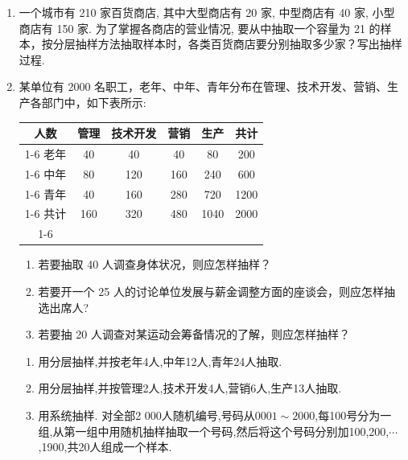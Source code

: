 \begin{enumerate}
    \item 一个城市有 210 家百货商店, 其中大型商店有 20 家, 中型商店有 40 家, 小型商店有 150 家. 为了掌握各商店的营业情况, 要从中抽取一个容量为 21 的样本，按分层抽样方法抽取样本时，各类百货商店要分别抽取多少家？写出抽样过程.
    \begin{jieda}
    \end{jieda}
    
    \item 某单位有 2000 名职工，老年、中年、青年分布在管理、技术开发、营销、生产各部门中，如下表所示:
    
    \begin{center}
    \begin{tabular}{|c|c|c|c|c|c|}
    \hline
    人数 & 管理 & 技术开发 & 营销 & 生产 & 共计 \\
    \cline{1-6}
    老年 & 40 & 40 & 40 & 80 & 200 \\
    \cline{1-6}
    中年 & 80 & 120 & 160 & 240 & 600 \\
    \cline{1-6}
    青年 & 40 & 160 & 280 & 720 & 1200 \\
    \cline{1-6}
    共计 & 160 & 320 & 480 & 1040 & 2000 \\
    \cline{1-6}
    \hline
    \end{tabular}
    \end{center}
    \begin{enumerate}
        \item 若要抽取 40 人调查身体状况，则应怎样抽样？
        \item 若要开一个 25 人的讨论单位发展与薪金调整方面的座谈会，则应怎样抽选出席人?
        \item 若要抽 20 人调查对某运动会筹备情况的了解，则应怎样抽样？
    \end{enumerate}
    \begin{jieda}
        \begin{enumerate}
            \item 用分层抽样,并按老年4人,中年12人,青年24人抽取.
            \item 用分层抽样,并按管理2人,技术开发4人,营销6人,生产13人抽取.
            \item 用系统抽样. 对全部2 000人随机编号,号码从$0001 \sim 2000$,每100号分为一组,从第一组中用随机抽样抽取一个号码,然后将这个号码分别加100,200,$\cdots$,1900,共20人组成一个样本.
        \end{enumerate}
    \end{jieda}
    

\end{enumerate}
